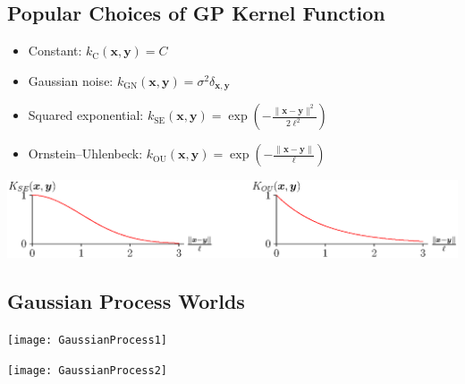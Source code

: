 \begin{slide}
\section[-2]{Popular Choices of GP Kernel Function}

\begin{PauseHighLight}
  \begin{itemize}
  \item Constant: $\displaystyle k_{\operatorname{C} }(\bm{x},\bm{y})=C$\pause
  \item Gaussian noise: $\displaystyle k_{\operatorname{GN}}(\bm{x},\bm{y})
    =\sigma ^{2}\delta _{\bm{x},\bm{y}}$\pause
  \item Squared exponential: $\displaystyle 
    k_{\operatorname{SE}}(\bm{x},\bm{y})
    =\exp \!\left(-{\frac {\|\bm{x}-\bm{y}\|^{2}}{2\ell^{2}}}\right)$\pause
  \item Ornstein–Uhlenbeck: $\displaystyle 
    k_{\operatorname{OU} }(\bm{x},\bm{y})=\exp \! \left(-{\frac
        {\|\bm{x}-\bm{y}\|}{\ell}}\right)$\pause
  \end{itemize}
\end{PauseHighLight}
\begin{center}
  \includegraphics[width=\linewidth]{gp_kernel}
\end{center}

\end{slide}



\begin{slide}
\section{Gaussian Process Worlds}

\begin{center}
  \texttt{[image: GaussianProcess1]}\pause
  \\
  \hfill

  \texttt{[image: GaussianProcess2]}\pauseb
\end{center}
\end{slide}


